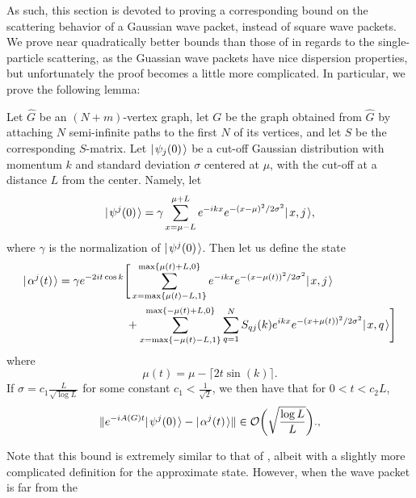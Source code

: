\documentclass[../thesis-main/thesis-main]{subfiles}
\begin{document}
As such, this section is devoted to proving a corresponding bound on the scattering behavior of a Gaussian wave packet, instead of square wave packets.  We prove near quadratically better bounds than those of \cite{MPQW} in regards to the single-particle scattering, as the Guassian wave packets have nice dispersion properties, but unfortunately the proof becomes a little more complicated.  In particular, we prove the following lemma:
\begin{theorem}
  Let $\widehat{G}$ be an $(N+m)$-vertex graph, let $G$ be the graph obtained from $\widehat{G}$ by attaching $N$ semi-infinite paths to the first $N$ of its vertices, and let $S$ be the corresponding $S$-matrix.  Let $|\mspace{2mu} \psi_j(0) \mspace{2mu} \rangle$ be a cut-off Gaussian distribution with momentum $k$ and standard deviation $\sigma$ centered at $\mu$, with the cut-off at a distance $L$ from the center.  Namely, let 
  \begin{equation}
    |\mspace{2mu} \psi^j(0) \mspace{2mu} \rangle = \gamma \sum_{x = \mu - L}^{\mu + L} e^{- i k x} e^{- (x - \mu)^2/2\sigma^2} |\mspace{2mu} x,j \mspace{2mu} \rangle  \label{eq:guass_start_defn},
  \end{equation}
  where $\gamma$ is the normalization of $|\mspace{2mu} \psi^j(0) \mspace{2mu} \rangle$.  Then let us define the state 
  \begin{align}
    |\mspace{2mu} \alpha^j(t) \mspace{2mu} \rangle &= \gamma e^{-2 i t \cos k} \Bigg[ \sum_{x = \max\{\mu(t) -L,1\}}^{\max\{\mu(t)+L,0\}} e^{-i k x} e^{ -(x - \mu(t))^2/2\sigma^2} 
    			 |\mspace{2mu} x,j \mspace{2mu} \rangle \nonumber\\
			  &\qquad\qquad\qquad+ \sum_{x = \max\{-\mu(t)-L,1\}}^{\max\{-\mu(t) + L,0\}} \sum_{q=1}^N  S_{qj}(k) e^{i k x} e^{-(x + \mu(t))^2/2\sigma^2} |\mspace{2mu} x,q \mspace{2mu} \rangle \Bigg]\label{eq:guass_approximation_defn}
  \end{align}
  where
  \begin{equation}
    \mu(t) = \mu - \lceil 2 t \sin(k)\rceil.
  \end{equation}
  If $\sigma = c_1 \frac{ L}{\sqrt{\log L}}$ for some constant $c_1 < \frac{1}{\sqrt{2}}$, we then have that for $0 < t < c_2 L$,  
  \begin{equation}
    \|{e^{-i A(G) t} |\mspace{2mu} \psi^j(0) \mspace{2mu} \rangle - |\mspace{2mu} \alpha^j (t) \mspace{2mu} \rangle}\| \in \mathcal{O} \bigg(\sqrt{\frac{\log L}{L}} \bigg).,
  \end{equation}  
\label{thm:single_particle_wavepacket_bound}
\end{theorem}

Note that this bound is extremely similar to that of \cite{MPQW}, albeit with a slightly more complicated definition for the approximate state.  However, when the wave packet is far from the 
\end{document}
